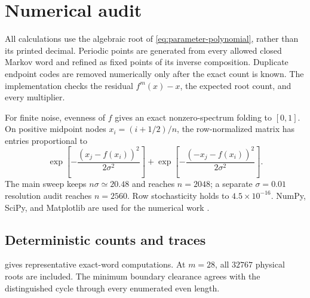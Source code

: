 \documentclass[11pt]{article}
\theoremstyle{definition}
\theoremstyle{remark}
\begin{document}
\section{Numerical audit}
\label{sec:numerics}

All calculations use the algebraic root of
\eqref{eq:parameter-polynomial}, rather than its printed decimal.  Periodic
points are generated from every allowed closed Markov word and refined as
fixed points of its inverse composition.  Duplicate endpoint codes are
removed numerically only after the exact count is known.  The implementation
checks the residual $f^m(x)-x$, the expected root count, and every multiplier.

For finite noise, evenness of $f$ gives an exact nonzero-spectrum folding to
$[0,1]$.  On positive midpoint nodes $x_i=(i+1/2)/n$, the row-normalized matrix
has entries proportional to
\begin{equation}\label{eq:folded-matrix}
 \exp\left[-\frac{(x_j-f(x_i))^2}{2\sigma^2}\right]
 +
 \exp\left[-\frac{(-x_j-f(x_i))^2}{2\sigma^2}\right].
\end{equation}
The main sweep keeps $n\sigma\simeq20.48$ and reaches $n=2048$; a separate
$\sigma=0.01$ resolution audit reaches $n=2560$.  Row stochasticity holds to
$4.5\times10^{-16}$.  NumPy, SciPy, and Matplotlib are used for the numerical
work \citep{HarrisEtAl2020,VirtanenEtAl2020,Hunter2007}.

\subsection{Deterministic counts and traces}

 gives representative exact-word computations.  At
$m=28$, all $32767$ physical roots are included.  The minimum boundary
clearance agrees with the distinguished cycle through every enumerated even
length.
\end{document}
